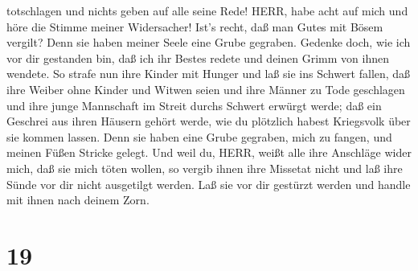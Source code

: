 totschlagen und nichts geben auf alle seine Rede!  HERR,
habe acht auf mich und höre die Stimme meiner Widersacher! 
Ist's recht, daß man Gutes mit Bösem vergilt? Denn sie haben meiner
Seele eine Grube gegraben. Gedenke doch, wie ich vor dir gestanden bin,
daß ich ihr Bestes redete und deinen Grimm von ihnen wendete.
 So strafe nun ihre Kinder mit Hunger und laß sie ins
Schwert fallen, daß ihre Weiber ohne Kinder und Witwen seien und ihre
Männer zu Tode geschlagen und ihre junge Mannschaft im Streit durchs
Schwert erwürgt werde;  daß ein Geschrei aus ihren Häusern
gehört werde, wie du plötzlich habest Kriegsvolk über sie kommen lassen.
Denn sie haben eine Grube gegraben, mich zu fangen, und meinen Füßen
Stricke gelegt.  Und weil du, HERR, weißt alle ihre
Anschläge wider mich, daß sie mich töten wollen, so vergib ihnen ihre
Missetat nicht und laß ihre Sünde vor dir nicht ausgetilgt werden. Laß
sie vor dir gestürzt werden und handle mit ihnen nach deinem Zorn.

\hypertarget{section-18}{%
\section{19}\label{section-18}}

